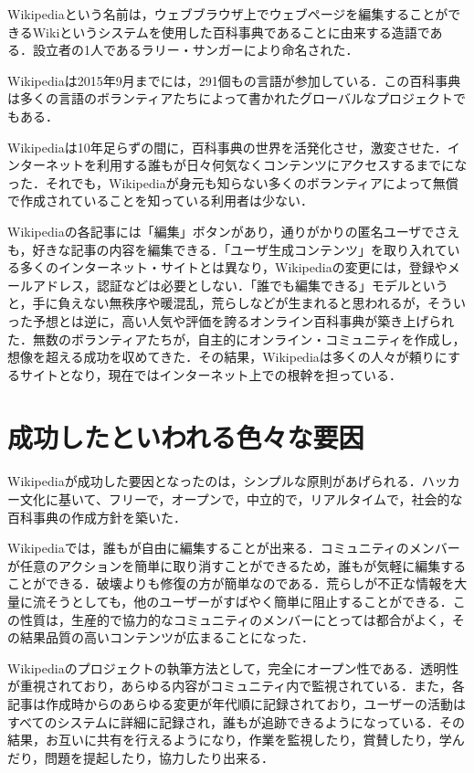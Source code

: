 Wikipediaという名前は，ウェブブラウザ上でウェブページを編集することができるWikiというシステムを使用した百科事典であることに由来する造語である．設立者の1人であるラリー・サンガーにより命名された．

Wikipediaは2015年9月までには，291個もの言語が参加している．この百科事典は多くの言語のボランティアたちによって書かれたグローバルなプロジェクトでもある．\cite{wikirevo}

Wikipediaは10年足らずの間に，百科事典の世界を活発化させ，激変させた．インターネットを利用する誰もが日々何気なくコンテンツにアクセスするまでになった．それでも，Wikipediaが身元も知らない多くのボランティアによって無償で作成されていることを知っている利用者は少ない．

Wikipediaの各記事には「編集」ボタンがあり，通りがかりの匿名ユーザでさえも，好きな記事の内容を編集できる．「ユーザ生成コンテンツ」を取り入れている多くのインターネット・サイトとは異なり，Wikipediaの変更には，登録やメールアドレス，認証などは必要としない．「誰でも編集できる」モデルというと，手に負えない無秩序や暖混乱，荒らしなどが生まれると思われるが，そういった予想とは逆に，高い人気や評価を誇るオンライン百科事典が築き上げられた．無数のボランティアたちが，自主的にオンライン・コミュニティを作成し，想像を超える成功を収めてきた．その結果，Wikipediaは多くの人々が頼りにするサイトとなり，現在ではインターネット上での根幹を担っている．

\section{成功したといわれる色々な要因}

Wikipediaが成功した要因となったのは，シンプルな原則があげられる．ハッカー文化に基いて、フリーで，オープンで，中立的で，リアルタイムで，社会的な百科事典の作成方針を築いた．

Wikipediaでは，誰もが自由に編集することが出来る．コミュニティのメンバーが任意のアクションを簡単に取り消すことができるため，誰もが気軽に編集することができる．破壊よりも修復の方が簡単なのである．荒らしが不正な情報を大量に流そうとしても，他のユーザーがすばやく簡単に阻止することができる．この性質は，生産的で協力的なコミュニティのメンバーにとっては都合がよく，その結果品質の高いコンテンツが広まることになった．

Wikipediaのプロジェクトの執筆方法として，完全にオープン性である．透明性が重視されており，あらゆる内容がコミュニティ内で監視されている．また，各記事は作成時からのあらゆる変更が年代順に記録されており，ユーザーの活動はすべてのシステムに詳細に記録され，誰もが追跡できるようになっている．その結果，お互いに共有を行えるようになり，作業を監視したり，賞賛したり，学んだり，問題を提起したり，協力したり出来る．


